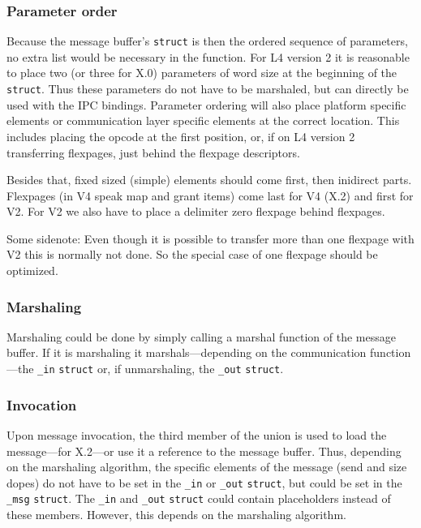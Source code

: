 \subsubsection{Parameter order}
Because the message buffer's \verb|struct| is then the ordered sequence of
parameters, no extra list would be necessary in the function.  For L4 version
2 it is reasonable to place  two (or three for X.0) parameters of word size at
the beginning of the \verb|struct|.  Thus these parameters do not have to be
marshaled, but can directly be used with the IPC  bindings.  Parameter
ordering will also place platform specific elements or communication layer
specific elements at the correct location.  This includes placing the opcode
at the first position, or, if on L4 version 2 transferring flexpages, just
behind the flexpage descriptors.

Besides that, fixed sized (simple) elements should come first, then
inidirect parts. Flexpages (in V4 speak map and grant items) come last for
V4 (X.2) and first for V2.  For V2 we also have to place a delimiter zero
flexpage behind flexpages.

Some sidenote: Even though it is possible to transfer more than one flexpage
with V2 this is normally not done.  So the special case of one flexpage should
be optimized.

\subsubsection{Marshaling}
Marshaling could be done by simply calling a marshal function of the
message buffer.  If it is marshaling it marshals---depending on the
communication function---the \verb|_in| \verb|struct| or, if unmarshaling,
the \verb|_out| \verb|struct|.

\subsubsection{Invocation}
Upon message invocation, the third member of the union is used to load the
message---for X.2---or use it a reference to the message buffer.  Thus,
depending on the marshaling algorithm, the specific elements of the message
(send and size dopes) do not have to be set in the \verb|_in| or \verb|_out|
\verb|struct|, but could be set in the \verb|_msg| \verb|struct|.  The
\verb|_in| and \verb|_out| \verb|struct| could contain placeholders instead of
these members.  However, this depends on the marshaling algorithm.
